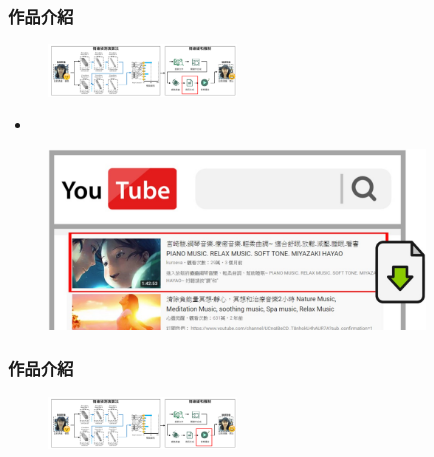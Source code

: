 \documentclass[10pt, conference, compsocconf]{beamer}
\begin{document}
\begin{CJK}{UTF8}{}
\begin{frame}
\frametitle{作品介紹}

\vspace{-5mm}
\begin{figure}[t]
\begin{flushright}
\includegraphics[width=5cm]{./Figures/framework7.pdf}
\end{flushright}
\end{figure}

\vspace{-5mm}

\begin{itemize}
\item {}
\end{itemize}

\begin{figure}[!t]
\begin{center}
\includegraphics[width=10cm]{./Figures/507.jpg}
\end{center}
\end{figure}
\end{frame}

\begin{frame}
\frametitle{作品介紹}

\vspace{-3mm}
\begin{figure}[t]
\begin{flushright}
\includegraphics[width=5cm]{./Figures/framework8.pdf}
\end{flushright}
\end{figure}

\vspace{-5mm}


\end{frame}
\end{CJK}
\end{document}
